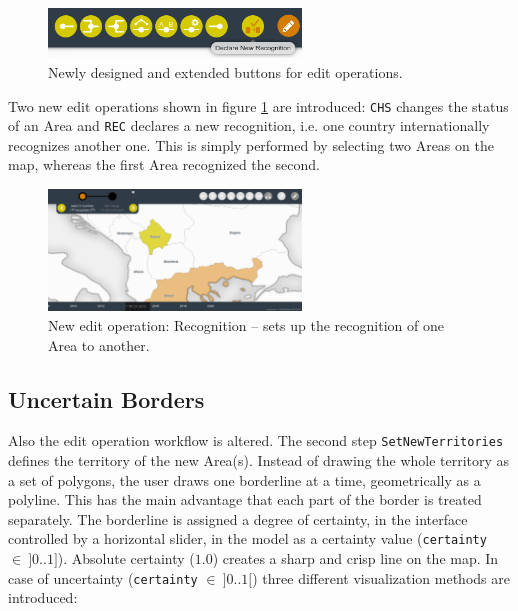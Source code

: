 \begin{figure}[ht]
  \centering
  \includegraphics[width = 0.6\textwidth]{graphics/extensions/edit_mode_extension.png}
  \caption{Newly designed and extended buttons for edit operations.}
  \label{fig:edit_mode_extension}
\end{figure}

Two new edit operations shown in figure \ref{fig:edit_mode_extension} are introduced: \texttt{CHS} changes the status of an Area and \texttt{REC} declares a new recognition, i.e. one country internationally recognizes another one. This is simply performed by selecting two Areas on the map, whereas the first Area recognized the second.

\begin{figure}[ht]
  \centering
  \includegraphics[width=0.6\textwidth]{graphics/extensions/operation_REC}
  \caption{New edit operation: Recognition -- sets up the recognition of one Area to another.}
  \label{fig:uncertainty_operation_REC}
\end{figure}


\subsection{Uncertain Borders} %
\label{sub:uncertain_borders}

Also the edit operation workflow is altered. The second step \texttt{SetNewTerritories} defines the territory of the new Area(s). Instead of drawing the whole territory as a set of polygons, the user draws one borderline at a time, geometrically as a polyline. This has the main advantage that each part of the border is treated separately. The borderline is assigned a degree of certainty, in the interface controlled by a horizontal slider, in the model as a certainty value (\texttt{certainty} $\in~]0 .. 1]$). Absolute certainty ($1.0$) creates a sharp and crisp line on the map. In case of uncertainty (\texttt{certainty} $\in~]0..1[$) three different visualization methods are introduced:

